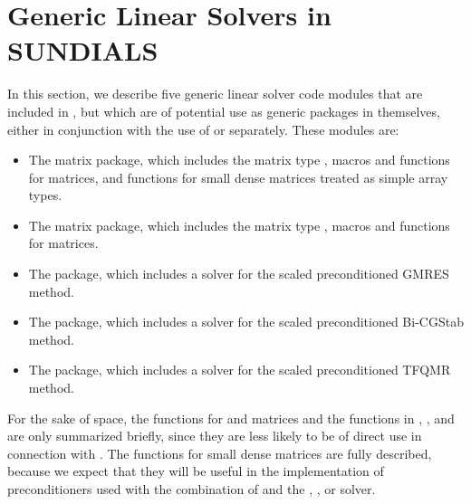 \chapter{Generic Linear Solvers in SUNDIALS}\label{s:gen_linsolv}
In this section, we describe five generic linear solver code modules that 
are included in {\ida}, but which are of potential use as generic packages in
themselves, either in conjunction with the use of {\ida} or separately.
These modules are:
\begin{itemize}
\item The {\dense} matrix package, which includes the matrix type ,
      macros and functions for  matrices, and functions
      for small dense matrices treated as simple array types.
\item The {\band} matrix package, which includes the matrix type ,
      macros and functions for  matrices.
\item The {\spgmr} package, which includes a solver for the scaled
      preconditioned GMRES method.
\item The {\spbcg} package, which includes a solver for the scaled
      preconditioned Bi-CGStab method.
\item The {\sptfqmr} package, which includes a solver for the scaled
      preconditioned TFQMR method.
\end{itemize}

For the sake of space, the functions for  and
 matrices and the functions in {\spgmr}, {\spbcg}, and {\sptfqmr}
are only summarized briefly, since they are less likely to be of direct use
in connection with {\ida}.  The functions for small dense matrices are fully
described, because we expect that they will be useful in the
implementation of preconditioners used with the combination of {\ida}
and the {\idaspgmr}, {\idaspbcg}, or {\idasptfqmr} solver.








